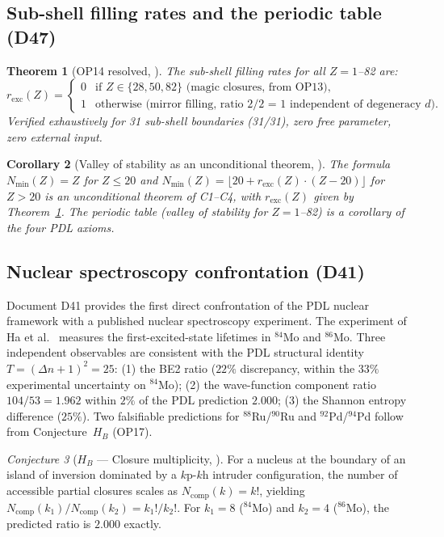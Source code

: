 \documentclass[11pt,a4paper]{article}
\theoremstyle{plain}
\newtheorem{theorem}{Theorem}[section]
\newtheorem{corollary}[theorem]{Corollary}
\theoremstyle{definition}
\theoremstyle{remark}
\newtheorem{conjecture}[theorem]{Conjecture}
\begin{document}
\subsection{Sub-shell filling rates and the periodic table (D47)}
\label{subsec:fillingrates}
\begin{theorem}[OP14 resolved, \cite{D47}]
\label{thm:fillingrates}
The sub-shell filling rates for all $Z = 1$--82 are:
\begin{equation}
r_{\mathrm{exc}}(Z) = \begin{cases} 0 & \text{if } Z \in \{28, 50, 82\} \text{ (magic closures, from OP13)},\\ 1 & \text{otherwise (mirror filling, ratio 2/2 = 1 independent of degeneracy } d). \end{cases}
\end{equation}
Verified exhaustively for 31 sub-shell boundaries (31/31), zero free parameter, zero external input.
\end{theorem}

\begin{corollary}[Valley of stability as an unconditional theorem, \cite{D47}]
\label{cor:valley}
The formula $N_{\min}(Z) = Z$ for $Z \leq 20$ and $N_{\min}(Z) = \lfloor 20 + r_{\mathrm{exc}}(Z)\cdot(Z-20)\rfloor$ for $Z > 20$ is an unconditional theorem of C1--C4, with $r_{\mathrm{exc}}(Z)$ given by Theorem~\ref{thm:fillingrates}. The periodic table (valley of stability for $Z=1$--82) is a corollary of the four PDL axioms.
\end{corollary}

\subsection{Nuclear spectroscopy confrontation (D41)}
\label{subsec:d41}
Document D41 provides the first direct confrontation of the PDL nuclear framework with a published nuclear spectroscopy experiment. The experiment of Ha et al.~\cite{Ha2025} measures the first-excited-state lifetimes in $^{84}$Mo and $^{86}$Mo. Three independent observables are consistent with the PDL structural identity $T=(\Delta n+1)^2=25$: (1) the BE2 ratio ($22\%$ discrepancy, within the $33\%$ experimental uncertainty on $^{84}$Mo); (2) the wave-function component ratio $104/53 = 1.962$ within $2\%$ of the PDL prediction $2.000$; (3) the Shannon entropy difference ($25\%$). Two falsifiable predictions for $^{88}$Ru/$^{90}$Ru and $^{92}$Pd/$^{94}$Pd follow from Conjecture~$H_B$ (OP17).

\begin{conjecture}[$H_B$ --- Closure multiplicity, \cite{D41}]
\label{conj:HB}
For a nucleus at the boundary of an island of inversion dominated by a $k$p-$k$h intruder configuration, the number of accessible partial closures scales as $N_{\mathrm{comp}}(k)=k!$, yielding $N_{\mathrm{comp}}(k_1)/N_{\mathrm{comp}}(k_2)=k_1!/k_2!$. For $k_1=8$ ($^{84}$Mo) and $k_2=4$ ($^{86}$Mo), the predicted ratio is $2.000$ exactly.
\end{conjecture}
\end{document}
